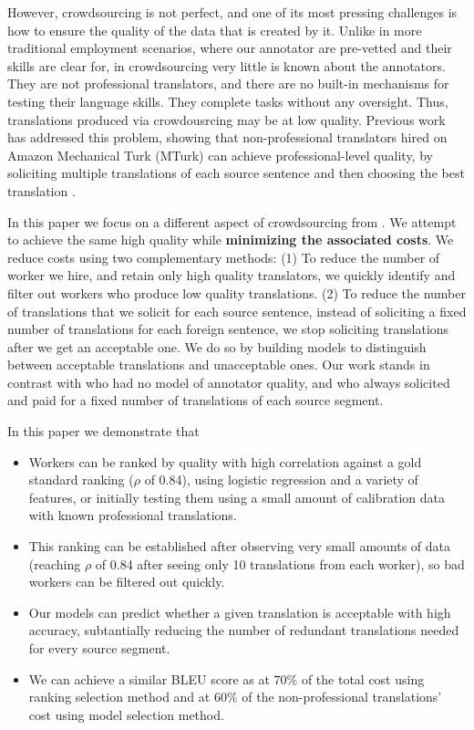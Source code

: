 \documentclass[11pt]{article}
\begin{document}
However, crowdsourcing is not perfect, and one of its most pressing challenges is how to ensure the quality of the data that is created by it.  Unlike in more traditional employment scenarios, where our annotator are pre-vetted and their skills are clear for, in crowdsourcing very little is known about the annotators.  They are not professional translators, and there are no built-in mechanisms for testing their language skills.  They complete tasks without any oversight. Thus, translations produced via crowdousrcing may be at low quality.
Previous work has addressed this problem, showing that non-professional translators hired on Amazon Mechanical Turk (MTurk) can achieve professional-level quality, by soliciting multiple translations of each source sentence and then choosing the best translation \cite{zaidan-callisonburch:2011:ACL-HLT2011a}.

In this paper we focus on a different aspect of crowdsourcing from .  We attempt to achieve the same high quality while {\bf minimizing the associated costs}.  
We  reduce costs using two complementary methods: (1) To reduce the number of worker we hire, and retain only high quality translators, we quickly identify and filter out workers who produce low quality translations. 
(2) To reduce the number of translations that we solicit for each source sentence, instead of soliciting a fixed number of translations for each foreign sentence, we stop soliciting translations after we get an acceptable one.  We do so by building models to distinguish between acceptable translations and unacceptable ones.  
Our work stands in contrast with   who had no model of annotator quality, and who always solicited and paid for a fixed number of translations of each source segment. 
 
 In this paper we demonstrate that
 \begin{itemize}
 \item Workers can be ranked by quality with high correlation against a gold standard ranking ($\rho$ of 0.84), using logistic regression and a variety of features, or initially testing them using a small amount of calibration data with known professional translations.
 \item This ranking can be established after observing very small amounts of data (reaching $\rho$ of 0.84 after seeing only 10 translations from each worker), so bad workers can be filtered out quickly.
 \item Our models can predict whether a given translation is acceptable with high accuracy, subtantially reducing the number of redundant translations needed for every source segment.
 \item We can achieve a similar BLEU score as  at 70\% of the total cost using ranking selection method and at 60\% of the non-professional translations' cost using model selection method.  
 \end{itemize} 
 
\end{document}
